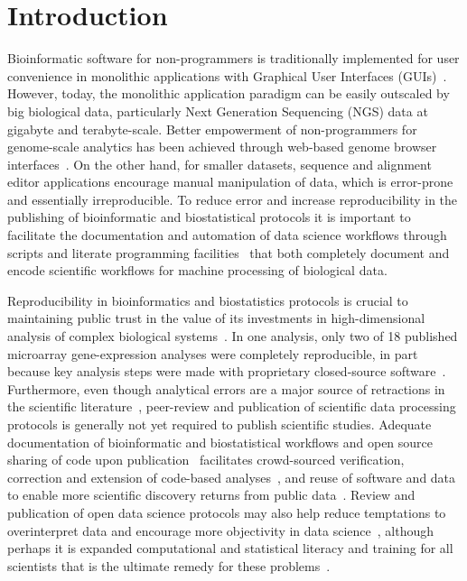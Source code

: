 \documentclass{frontiersSCNS} %
\begin{document}
\section{Introduction}

Bioinformatic software for non-programmers is traditionally
implemented for user convenience in monolithic applications with
Graphical User Interfaces (GUIs)~\citep{Smith1994, Rampp2006,
  Librado01062009,Waterhouse01052009,gouy2010seaview}.  However,
today, the monolithic application paradigm can be easily outscaled by
big biological data, particularly Next Generation Sequencing (NGS)
data at gigabyte and terabyte-scale.  Better empowerment of
non-programmers for genome-scale analytics has been achieved through
web-based genome browser
interfaces~\citep{Cunningham28012015,Rosenbloom28012015,Markowitz01012014}. On
the other hand, for smaller datasets, sequence and alignment editor
applications encourage manual manipulation of data, which is
error-prone and essentially irreproducible. To reduce error and
increase reproducibility in the publishing of bioinformatic and
biostatistical protocols it is important to facilitate the
documentation and automation of data science workflows through scripts
and literate programming facilities~\citep{knuth1984literate} that
both completely document and encode scientific workflows for machine
processing of biological data.

Reproducibility in bioinformatics and biostatistics protocols is
crucial to maintaining public trust in the value of its investments in
high-dimensional analysis of complex biological
systems~\citep{BaggerlyCoombes2009,hutson2010data,Baggerly01052011,Huang01072013}.
In one analysis, only two of 18 published microarray gene-expression
analyses were completely reproducible, in part because key analysis
steps were made with proprietary closed-source
software~\citep{Ioannidis:2008cr}. Furthermore, even though analytical
errors are a major source of retractions in the scientific
literature~\citep{Casadevall01092014}, peer-review and publication of
scientific data processing protocols is generally not yet required to
publish scientific studies.  Adequate documentation of bioinformatic
and biostatistical workflows and open source sharing of code upon
publication~\citep{Peng01072009} facilitates crowd-sourced
verification, correction and extension of code-based
analyses~\citep{barnes2010publish,Morin13042012}, and reuse of
software and data to enable more scientific discovery returns from
public data~\citep{Peng02122011}. Review and publication of open data
science protocols may also help reduce temptations to overinterpret
data and encourage more objectivity in data
science~\citep{Boulesteix01022010}, although perhaps it is expanded
computational and statistical literacy and training for all scientists
that is the ultimate remedy for these
problems~\citep{Morin13042012,Joppa17052013}.
\end{document}
